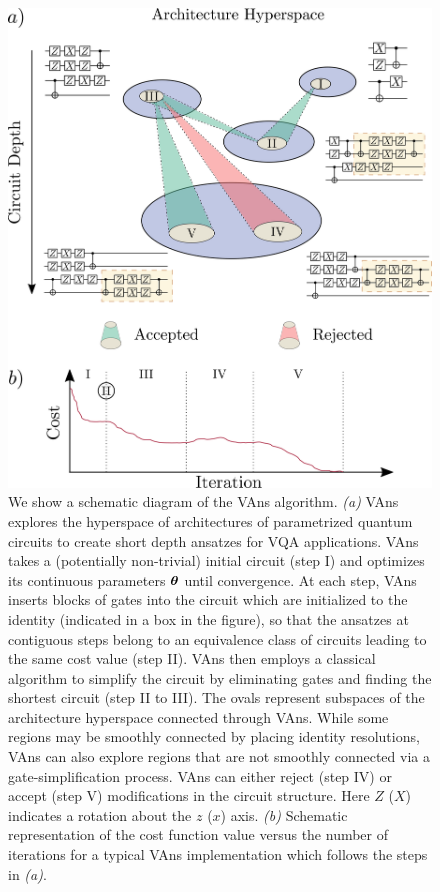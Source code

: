 \begin{figure}[h!]
\centering
\includegraphics[width=.8\textwidth]{Figures/VANS/Fig1.pdf}
\caption{{\small We show a schematic diagram of the VAns algorithm. \textit{(a)} VAns explores the hyperspace of architectures of parametrized quantum circuits to create short depth ansatzes for VQA applications. VAns takes a (potentially non-trivial) initial circuit (step I) and optimizes its continuous parameters $\bm{\theta}$ until convergence. At each step, VAns inserts blocks of gates into the circuit which are initialized to the identity (indicated in a box in the figure), so that the ansatzes at contiguous steps belong to an equivalence class of circuits leading to the same cost value (step II). VAns then employs a classical algorithm to simplify the circuit by eliminating gates and finding the shortest circuit (step II to III). The ovals represent subspaces of the architecture hyperspace connected through VAns. While some regions may be smoothly connected by placing identity resolutions, VAns can also explore regions that are not smoothly connected via a gate-simplification process. VAns can either reject (step IV) or accept (step V) modifications in the circuit structure. Here $Z$ ($X$) indicates a rotation about the $z$ ($x$) axis. \textit{(b)} Schematic representation of the cost function value versus the number of iterations for a typical VAns implementation which follows the steps in \textit{(a)}.}}
\label{fig:schematic}
\end{figure}

